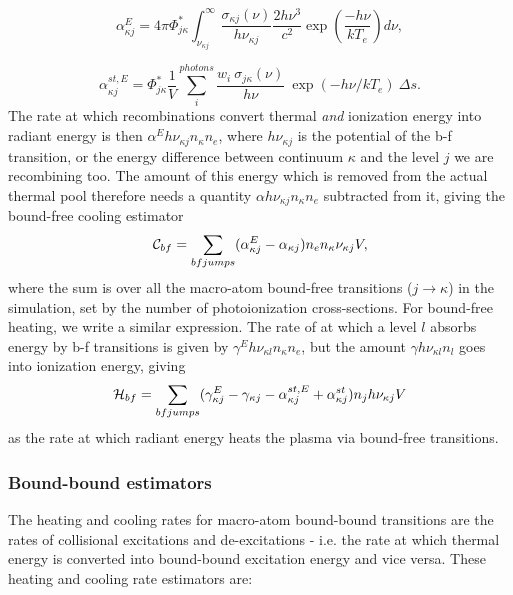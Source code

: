 \begin{equation}
\alpha^E_{\kappa j} = 4\pi \Phi^*_{j\kappa} \int^\infty_{\nu_{\kappa j}} 
\frac{\sigma_{\kappa j}(\nu)}{h \nu_{\kappa j}} \frac{2 h \nu^3}{c^2} 
\exp \left( \frac{- h \nu}{k T_e} \right) d\nu,
\end{equation}

\begin{equation}
\alpha_{\kappa j}^{st,E} = \Phi^*_{j\kappa}
\frac{1}{V} \sum_i^{photons} 
\frac{w_i~\sigma_{j\kappa}({\nu})}{h \nu}
~\exp(-h\nu/kT_e)~\Delta s.
\end{equation}
The rate at which recombinations convert
thermal {\em and} ionization energy into radiant energy is then
$\alpha^E h\nu_{\kappa j} n_\kappa n_e$, where $h \nu_{\kappa j}$ is the potential of the 
b-f transition, or the energy difference between continuum $\kappa$ and 
the level $j$ we are recombining too. 
The amount of this energy which is removed from the actual thermal pool
therefore needs a quantity $\alpha h\nu_{\kappa j} n_\kappa n_e$ subtracted from it,
giving the bound-free cooling estimator
\begin{equation}
{\cal C}_{bf} = \sum_{bf jumps} (\alpha^E_{\kappa j} - \alpha_{\kappa j}) n_e n_{\kappa}\nu_{\kappa j} V,
\end{equation}
where the sum is over all the macro-atom bound-free transitions ($j\rightarrow\kappa$) 
in the simulation, set by
the number of photoionization cross-sections. 
For bound-free heating, we write a similar expression. The rate of at which
a level $l$ absorbs energy by b-f transitions is given by $\gamma^E h\nu_{\kappa l} n_\kappa n_e$,
but the amount $\gamma h \nu_{\kappa l} n_l$ goes into ionization energy, giving 
\begin{equation}
{\cal H}_{bf} = \sum_{bf jumps} (\gamma^E_{\kappa j} - \gamma_{\kappa j} - \alpha^{st,E}_{\kappa j} + \alpha^{st}_{\kappa j}) n_j h \nu_{\kappa j} V
\end{equation}
as the rate at which radiant energy heats the plasma via bound-free transitions.

\subsubsection{Bound-bound estimators}
The heating and cooling rates for macro-atom bound-bound transitions are the rates of
collisional excitations and de-excitations
- i.e. the rate at which thermal energy is converted into
bound-bound excitation energy and vice versa.
These heating and cooling rate estimators are:


